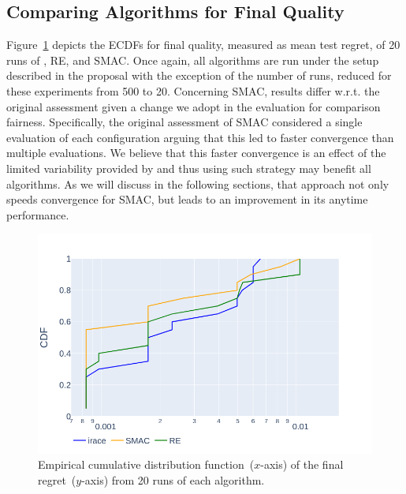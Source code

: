 \subsection{Comparing Algorithms for Final Quality}
Figure~\ref{fig:ecdf-original} depicts the ECDFs for final quality, measured as mean test regret, of 20 runs of \irace, RE, and SMAC. Once again, all algorithms are run under the setup described in the \nasbench proposal with the exception of the number of runs, reduced for these experiments from 500 to 20.
Concerning SMAC, results differ w.r.t. the original \nasbench assessment given a change we adopt in the evaluation for comparison fairness. Specifically, the original assessment of SMAC considered a single evaluation of each configuration arguing that this led to faster convergence than multiple evaluations. We believe that this faster convergence is an effect of the limited variability provided by \nasbench and thus using such strategy may benefit all algorithms. As we will discuss in the following sections, that approach not only speeds convergence for SMAC, but leads to an improvement in its anytime performance. %
\begin{figure}[!t]
\centering
\includegraphics[width=0.8\linewidth, clip=true, trim=45px 20px 75px 50px]{imgs/ecdf-fnn-nocache.png}
\caption{Empirical cumulative distribution function~($x$-axis) of the final regret~($y$-axis) from 20 runs of each algorithm.}
\label{fig:ecdf-original}
\end{figure}

